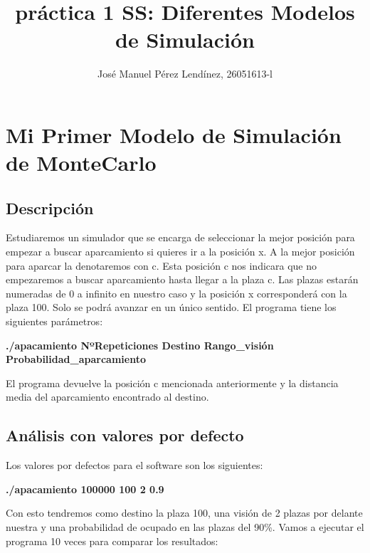 \documentclass[]{article}
\title{práctica 1 SS: Diferentes Modelos de Simulación}
\author{José Manuel Pérez Lendínez, 26051613-l}
\begin{document}
	
	\maketitle
	
	
	\newpage
	\tableofcontents
	\newpage
	
\section{Mi Primer Modelo de Simulación de MonteCarlo}
\subsection{Descripción}
Estudiaremos un simulador que se encarga de seleccionar la mejor posición para empezar a buscar aparcamiento si quieres ir a la posición x. A la mejor posición para aparcar la denotaremos con c. Esta posición c nos indicara que no empezaremos a buscar aparcamiento hasta llegar a la plaza c. Las plazas estarán numeradas de 0 a infinito en nuestro caso y la posición x corresponderá con la plaza 100. Solo se podrá avanzar en un único sentido.
El programa tiene los siguientes parámetros:
\newline

	\textbf{./apacamiento NºRepeticiones Destino Rango\_visión Probabilidad\_aparcamiento}
\newline

El programa devuelve la posición c mencionada anteriormente y la distancia media del aparcamiento encontrado al destino.

 \subsection{Análisis con valores por defecto}
 Los valores por defectos para el software son los siguientes: 
 
 \textbf{./apacamiento 100000 100 2 0.9}
 \newline
 
 Con esto tendremos como destino la plaza 100, una visión de 2 plazas por delante nuestra y una probabilidad de ocupado en las plazas del 90\%.
 Vamos a ejecutar el programa 10 veces para comparar los resultados:
 
\end{document}
